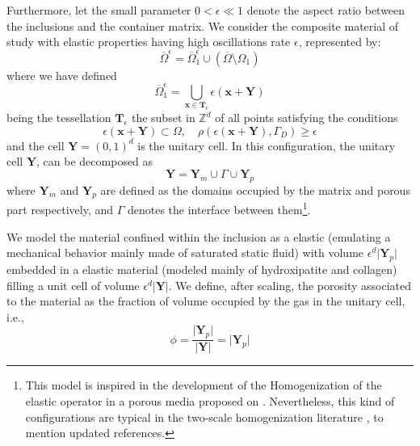 Furthermore, let the small parameter $0 < \epsilon \ll 1$ denote the aspect ratio between the inclusions and the container matrix. 
We consider the composite material of study with elastic properties having high oscillations rate $\epsilon$, represented by:
\begin{equation*}
	\overline{\Omega}^{\epsilon} = \overline{\Omega}^{\epsilon}_1  \cup (\overline{\Omega}\setminus \Omega_1) 
\end{equation*}
where we have defined
\begin{equation*}
    \overline{\Omega}^{\epsilon}_1 = \bigcup_{\mathbf{x} \in \mathbf{T}_{\epsilon}} \epsilon ( \mathbf{x} + \mathbf{Y} )
\end{equation*}
being the tessellation $\mathbf{T}_{\epsilon}$ the subset in $\mathbb{Z}^d$ of all points satisfying the conditions
\begin{equation*}
    \epsilon (\mathbf{x} + \mathbf{Y}) \subset \Omega, \quad \rho(\epsilon(\mathbf{x}+\mathbf{Y}), \Gamma_D) \geq \epsilon
\end{equation*}
and the cell $\mathbf{Y} = (0, 1)^d$ is the unitary cell. 
In this configuration, the unitary cell $\mathbf{Y}$, can be decomposed as
\begin{equation*}
	\mathbf{Y} = \mathbf{Y}_m \cup \Gamma \cup \mathbf{Y}_p 
\end{equation*}
where $\mathbf{Y}_m$ and $\mathbf{Y}_p$ are defined as the domains occupied by the matrix and porous part respectively, and $\Gamma$ denotes the interface between them\footnote{This model is inspired in the development of the Homogenization of the elastic operator in a porous media proposed on \cite{christensen1982theory}. Nevertheless, this kind of configurations are typical in the two-scale homogenization literature \cite{panasenko2005multi-scale}, \cite{Boughammoura2013} to mention updated references.}.
\begin{rem}
We model the material confined within the inclusion as a elastic (emulating a mechanical behavior mainly made of saturated static fluid) with volume $\epsilon^d \vert \mathbf{Y}_p \vert$ embedded in a elastic material (modeled mainly of hydroxipatite and collagen) filling a unit cell of volume $\epsilon^d \vert \mathbf{Y} \vert$.
We define, after scaling, the porosity associated to the material as the fraction of volume occupied by the gas in the unitary cell, i.e., 
\begin{equation*}
\phi = \frac{\vert \mathbf{Y}_p \vert}{\vert \mathbf{Y} \vert} = \vert \mathbf{Y}_p \vert
\end{equation*}
\end{rem}


